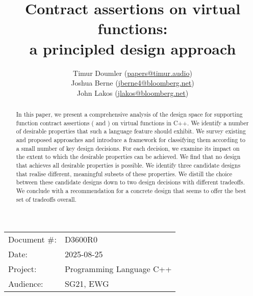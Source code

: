 \newcommand{\propref}[1]{\hyperref[#1]{\tcode{#1}}}



\title{Contract assertions on virtual functions: \\ a principled design approach}
\author{
Timur Doumler \small(\href{mailto:papers@timur.audio}{papers@timur.audio}) \\
Joshua Berne \small(\href{mailto:jberne4@bloomberg.net}{jberne4@bloomberg.net}) \\
John Lakos \small(\href{mailto:jlakos@bloomberg.net}{jlakos@bloomberg.net}) 
}
\date{}
\maketitle

\begin{tabular}{ll}
Document \#: & D3600R0 \\
Date: &2025-08-25 \\
Project: & Programming Language C++ \\
Audience: & SG21, EWG
\end{tabular}

\begin{abstract}
In this paper, we present a comprehensive analysis of the design space for supporting function contract assertions ( and ) on virtual functions in C++. We identify a number of desirable properties that such a language feature should exhibit. We survey existing and proposed approaches and introduce a framework for classifying them according to a small number of key design decisions. For each decision, we examine its impact on the extent to which the desirable properties can be achieved. We find that no design that achieves all desirable properties is possible. We identify three candidate designs that realise different, meaningful subsets of these properties. We distill the choice between these candidate designs down to two design decisions with different tradeoffs. We conclude with a recommendation for a concrete design that seems to offer the best set of tradeoffs overall.
\end{abstract}


\pagebreak
\tableofcontents*
\pagebreak


